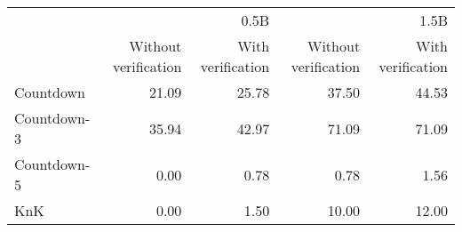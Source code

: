 \begin{tabular}{lrrrr}
\toprule
 & \multicolumn{2}{r}{0.5B} & \multicolumn{2}{r}{1.5B} \\
 & Without verification & With verification & Without verification & With verification \\
\midrule
Countdown & 21.09 & 25.78 & 37.50 & 44.53 \\
Countdown-3 & 35.94 & 42.97 & 71.09 & 71.09 \\
Countdown-5 & 0.00 & 0.78 & 0.78 & 1.56 \\
KnK & 0.00 & 1.50 & 10.00 & 12.00 \\
\bottomrule
\end{tabular}
